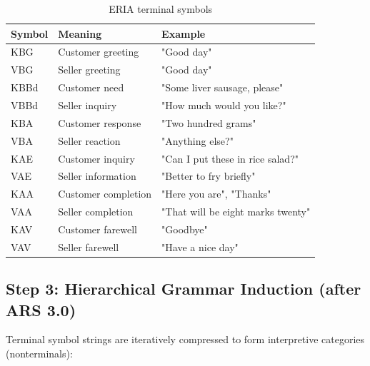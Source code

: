\documentclass[12pt,a4paper]{article}
\begin{document}
\begin{table}[H]
\centering
\caption{ERIA terminal symbols}
\label{tab:terminal}
\begin{tabular}{@{} l l l @{}}
\toprule
\textbf{Symbol} & \textbf{Meaning} & \textbf{Example} \\
\midrule
KBG & Customer greeting & "Good day" \\
VBG & Seller greeting & "Good day" \\
KBBd & Customer need & "Some liver sausage, please" \\
VBBd & Seller inquiry & "How much would you like?" \\
KBA & Customer response & "Two hundred grams" \\
VBA & Seller reaction & "Anything else?" \\
KAE & Customer inquiry & "Can I put these in rice salad?" \\
VAE & Seller information & "Better to fry briefly" \\
KAA & Customer completion & "Here you are", "Thanks" \\
VAA & Seller completion & "That will be eight marks twenty" \\
KAV & Customer farewell & "Goodbye" \\
VAV & Seller farewell & "Have a nice day" \\
\bottomrule
\end{tabular}
\end{table}

\subsection{Step 3: Hierarchical Grammar Induction (after ARS 3.0)}

Terminal symbol strings are iteratively compressed to form interpretive categories (nonterminals):
\end{document}
